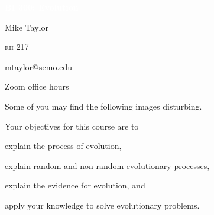 \documentclass[t,handout]{beamer}  %
\begin{document}
	

{
	\begin{frame}[t]{\textcolor{white}{\textbf{BI 300: Evolution}}}
\end{frame}
}

{
\begin{frame}[t,plain]
\large
\vspace{5ex}
\hangpara\hspace{17em} Mike Taylor

\hangpara\hspace{17em} \textsc{rh} 217

\hangpara\hspace{17em} mtaylor@semo.edu

\hangpara\hspace{17em} Zoom office hours

\end{frame}
}



\begin{frame}{}

\hangpara Some of you may find the following images disturbing.

\end{frame}


{
\begin{frame}[t]
\end{frame}
}

{
\begin{frame}[t]
\end{frame}
}



\begin{frame}[t]{Your objectives for this course are to}
	
	\hangpara explain the process of evolution, 
	
	\hangpara explain random and non-random evolutionary processes,
	
	\hangpara explain the evidence for evolution, and
	
	\hangpara apply your knowledge to solve evolutionary problems.
	
\end{frame}
\end{document}
